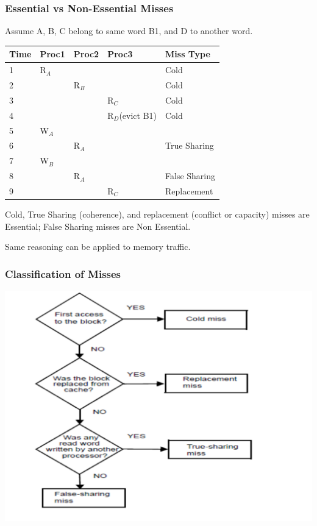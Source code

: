 \documentclass{beamer}
\renewcommand{\emph}[1]{\textcolor{structure}{#1}}
\begin{document}
\begin{frame}[fragile,t]
\frametitle{Essential vs Non-Essential Misses}

Assume A, B, C belong to same word B1, and D to another word.
\begin{tabular}{lllll}
\hline
Time    & Proc1 & Proc2 & Proc3 & Miss Type \\\hline
1       & R$_A$ &       &       & Cold      \\
2       &       & R$_B$ &       & Cold      \\
3       &       &       & R$_C$ & Cold      \\
4       &       &       & R$_D$(evict B1) & Cold      \\
5       & W$_A$ &       &       &           \\
6       &       & R$_A$ &       & True Sharing      \\
7       & W$_B$ &       &       &           \\
8       &       & R$_A$ &       & False Sharing     \\
9       &       &       & R$_C$ & Replacement \\\hline
\end{tabular}
\bigskip

Cold, True Sharing (coherence), and replacement (conflict or capacity)
misses are \emph{Essential}; False Sharing misses are \alert{Non Essential}.\bigskip

Same reasoning can be applied to memory traffic.
\end{frame}

\begin{frame}[fragile,t]
\frametitle{Classification of Misses}
\includegraphics[width=59ex]{FigsInfCoherence/MissClassif}
\end{frame}
\end{document}

